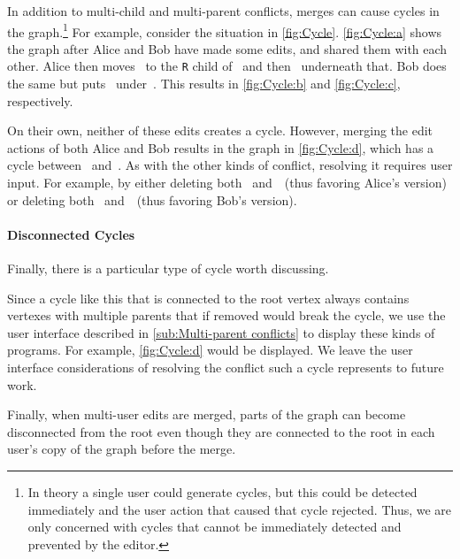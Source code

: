 In addition to multi-child and multi-parent conflicts, merges
can cause cycles in the graph.\footnote{In theory a single user could
generate cycles, but this could be detected immediately and the user action
that caused that cycle rejected.
Thus, we are only concerned with cycles that cannot be immediately detected
and prevented by the editor.}
For example, consider the situation in \autoref{fig:Cycle}.
\autoref{fig:Cycle:a} shows the graph after Alice and Bob have made some edits,
and shared them with each other.
Alice then moves~\vMultiCycleTimes{} to the \texttt{R} child of~\vWrapPlus{}
and then~\vMultiCyclePlus{} underneath that.
Bob does the same but puts~\vMultiCycleTimes{} under~\vMultiCyclePlus{}.
This results in \autoref{fig:Cycle:b} and \autoref{fig:Cycle:c}, respectively.

On their own, neither of these edits creates a cycle.
However, merging the edit actions of both Alice and Bob results in the graph
in \autoref{fig:Cycle:d}, which has a cycle
between~\vMultiCycleTimes{} and~\vMultiCyclePlus{}.
As with the other kinds of conflict, resolving it requires user input.
For example, by either deleting both~\eMultiCycleBobPlus{} and~\eMultiCycleBobTimes{}~(thus favoring Alice's version)
or deleting both~\eMultiCycleAliceTimes{} and~\eMultiCycleAlicePlus{}~(thus favoring Bob's version).

\paragraph{Disconnected Cycles}

\figureDisconnect




Finally, there is a particular type of cycle worth discussing.

Since a cycle like this that is connected to the root vertex always
contains vertexes with multiple parents that if removed would break the cycle,
we use the user interface described in \autoref{sub:Multi-parent conflicts}
to display these kinds of programs.
For example, \autoref{fig:Cycle:d} would be displayed.
We leave the user interface considerations of resolving the conflict such a
cycle represents to future work.

Finally, when multi-user edits are merged,
parts of the graph can become disconnected from the root
even though they are connected to the root in each user's
copy of the graph before the merge.

